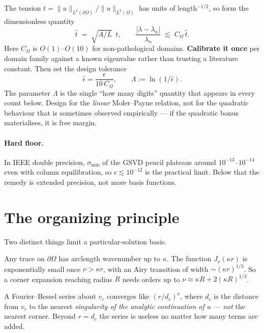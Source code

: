 \documentclass[11pt]{article}
\begin{document}
The tension $t=\|u\|_{L^2(\partial\Omega)}/\|u\|_{L^2(\Omega)}$ has units of
length$^{-1/2}$, so form the dimensionless quantity
\[
  \hat t \;=\; \sqrt{A/L}\;\, t ,
  \qquad
  \frac{|\lambda-\lambda_n|}{\lambda_n}\;\lesssim\; C_\Omega\,\hat t .
\]
Here $C_\Omega$ is $O(1)$--$O(10)$ for non-pathological domains.
\textbf{Calibrate it once} per domain family against a known eigenvalue rather than
trusting a literature constant. Then set the design tolerance
\begin{equation}
  \boxed{\;
  \hat\epsilon=\frac{\epsilon}{10\,C_\Omega},
  \qquad
  \Lambda:=\ln(1/\hat\epsilon).
  \;}
  \label{eq:Lambda}
\end{equation}
The parameter $\Lambda$ is the single ``how many digits'' quantity that appears in
every count below. Design for the \emph{linear} Moler--Payne relation, not for the
quadratic behaviour that is sometimes observed empirically --- if the quadratic bonus
materialises, it is free margin.

\paragraph{Hard floor.} In IEEE double precision, $\sigma_{\min}$ of the GSVD pencil
plateaus around $10^{-13}$--$10^{-14}$ even with column equilibration, so
$\epsilon\lesssim 10^{-12}$ is the practical limit. Below that the remedy is extended
precision, not more basis functions.

\section{The organizing principle}
\label{sec:principle}

Two distinct things limit a particular-solution basis.

\begin{description}[leftmargin=2.2em,style=nextline]
\item[(a) Oscillation.]
  Any trace on $\partial\Omega$ has arclength wavenumber up to $\kappa$. The function
  $J_\nu(\kappa r)$ is exponentially small once $\nu>\kappa r$, with an Airy
  transition of width $\sim(\kappa r)^{1/3}$. So a corner expansion reaching radius
  $R$ needs orders up to $\nu\approx \kappa R + 2(\kappa R)^{1/3}$.
\item[(b) Analytic continuation.]
  A Fourier--Bessel series about $v_c$ converges like $(r/d_c)^{\nu}$, where $d_c$ is
  the distance from $v_c$ to the nearest \emph{singularity of the analytic
  continuation of $u$} --- \emph{not} the nearest corner. Beyond $r=d_c$ the series
  is useless no matter how many terms are added.
\end{description}
\end{document}
